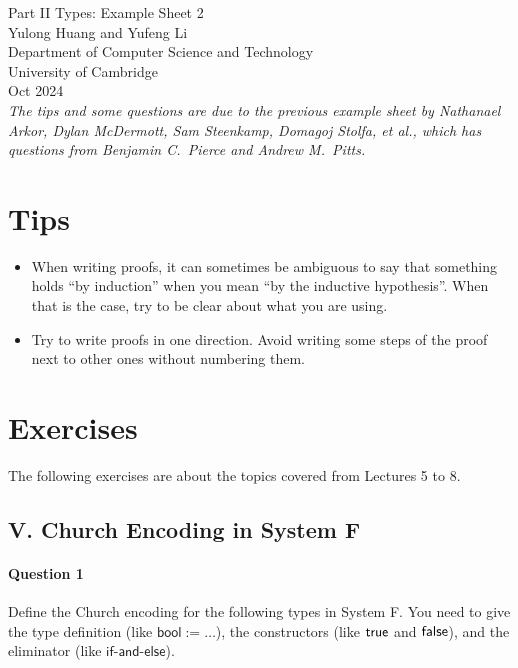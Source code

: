 \documentclass[11pt,a4paper,twoside]{article}
\begin{document}
\begin{center}
{\Huge Part II Types: Example Sheet 2}\\
\vspace{1.0em}
{\large Yulong Huang and Yufeng Li}\\
\vspace{0.5em}
{\small Department of Computer Science and Technology \\ University of Cambridge \\ Oct 2024}\\
\vspace{1.0em}
\small{\textit{The tips and some questions are due to the previous example sheet by Nathanael Arkor, Dylan McDermott, Sam Steenkamp, Domagoj Stolfa, et al., which has questions from Benjamin C.~Pierce and Andrew M.~Pitts.}}
\end{center}

\section*{Tips}

\begin{itemize}

\item When writing proofs, it can sometimes be ambiguous to say that something holds ``by induction'' when you mean ``by the inductive hypothesis''. When that is the case, try to be clear about what you are using.

\item Try to write proofs in one direction. Avoid writing some steps of the proof next to other ones without numbering them.

\end{itemize}

\section*{Exercises}

The following exercises are about the topics covered from Lectures 5 to 8.

\subsection*{V. Church Encoding in System F}

\paragraph{Question 1} Define the Church encoding for the following types in System F.
You need to give the type definition (like $\mathsf{bool} := \dots$), the constructors (like $\mathsf{true}$ and $\mathsf{false}$),
and the eliminator (like $\mathsf{if\text{-}and\text{-}else}$).
\end{document}
